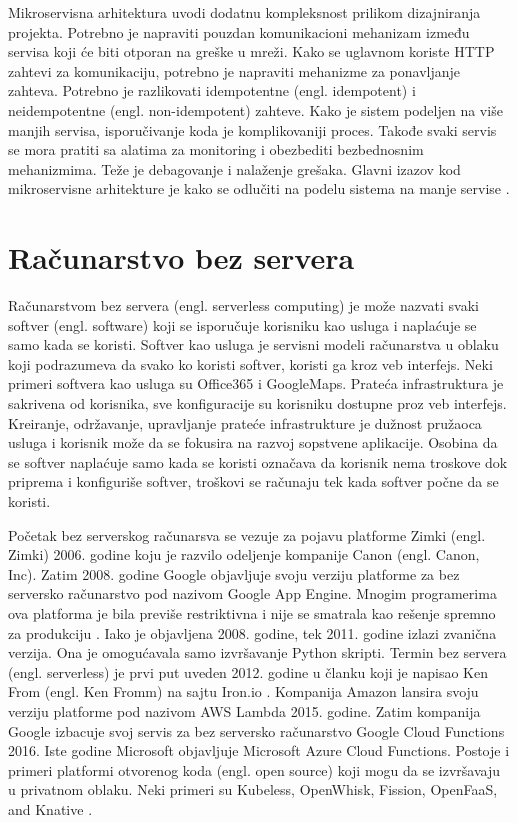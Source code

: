 \documentclass[12pt,oneside]{memoir}
\begin{document}
Mikroservisna arhitektura uvodi dodatnu kompleksnost prilikom dizajniranja projekta. Potrebno je napraviti pouzdan komunikacioni mehanizam između servisa koji će biti otporan na greške u mreži. Kako se uglavnom koriste HTTP zahtevi za komunikaciju, potrebno je napraviti mehanizme za ponavljanje zahteva. Potrebno je razlikovati idempotentne (engl. idempotent) i neidempotentne (engl. non-idempotent) zahteve. Kako je sistem podeljen na više manjih servisa, isporučivanje koda je komplikovaniji proces. Takođe svaki servis se mora pratiti sa alatima za monitoring i obezbediti bezbednosnim mehanizmima. Teže je debagovanje i nalaženje grešaka. Glavni izazov kod mikroservisne arhitekture je kako se odlučiti na podelu sistema na manje servise \cite{bm}.

\chapter{Računarstvo bez servera}
\label{chp:razrada}

Računarstvom bez servera (engl. serverless computing) je može nazvati svaki softver (engl. software) koji se isporučuje korisniku kao usluga i naplaćuje se samo kada se koristi\cite{sa}. Softver kao usluga je servisni modeli računarstva u oblaku koji podrazumeva da svako ko koristi softver, koristi ga kroz veb interfejs. Neki primeri softvera kao usluga su Office365 i GoogleMaps. Prateća infrastruktura je sakrivena od korisnika, sve konfiguracije su korisniku dostupne proz veb interfejs. Kreiranje, održavanje, upravljanje prateće infrastrukture je dužnost pružaoca usluga i korisnik može da se fokusira na razvoj sopstvene aplikacije. Osobina da se softver naplaćuje samo kada se koristi označava da korisnik nema troskove dok priprema i konfiguriše softver, troškovi se računaju tek kada softver počne da se koristi.

Početak bez serverskog računarsva se vezuje za pojavu platforme Zimki (engl. Zimki) 2006. godine koju je razvilo odeljenje kompanije Canon (engl. Canon, Inc). Zatim 2008. godine Google objavljuje svoju verziju platforme za bez serversko računarstvo pod nazivom Google App Engine. Mnogim programerima ova platforma je bila previše restriktivna i nije se smatrala kao rešenje spremno za produkciju \cite{ls}. Iako je objavljena 2008. godine, tek 2011. godine izlazi zvanična verzija. Ona je omogućavala samo izvršavanje Python skripti. Termin bez servera (engl. serverless) je prvi put uveden 2012. godine u članku koji je napisao Ken From (engl. Ken Fromm) na sajtu Iron.io \cite{wtfosaais}. Kompanija Amazon lansira svoju verziju platforme pod nazivom AWS Lambda 2015. godine. Zatim kompanija Google izbacuje svoj servis za bez serversko računarstvo Google Cloud Functions 2016. Iste godine Microsoft objavljuje Microsoft Azure Cloud Functions. Postoje i primeri platformi otvorenog koda (engl. open source) koji mogu da se izvršavaju u privatnom oblaku. Neki primeri su Kubeless, OpenWhisk, Fission, OpenFaaS, and Knative \cite{ws}.
\end{document}
